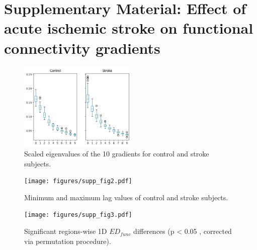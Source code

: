 \documentclass[fleqn,10pt]{wlscirep}
\begin{document}

\printbibliography

\newpage
\appendix
\section*{Supplementary Material: Effect of acute ischemic stroke on functional connectivity gradients}

\setcounter{figure}{0}
\renewcommand{\figurename}{Supplementary Figure}

\begin{figure}[h!]
\centering
\includegraphics[width=0.5\textwidth]{figures/supp_fig1.png}
\renewcommand{\figurename}{Supplementary Figure}
\caption{\label{fig:lambdas} Scaled eigenvalues of the 10 gradients for control and stroke subjects.  } 
\end{figure}

\begin{figure}[b]
\centering
\texttt{[image: figures/supp\_fig2.pdf]}
\caption{\label{fig:lags_hist}  Minimum and maximum lag values of control and stroke subjects.}
\end{figure}

\begin{figure}[b]
\centering
\texttt{[image: figures/supp\_fig3.pdf]}
\caption{\label{fig:1d_edfunc}  Significant regions-wise 1D $\textit{ED}_{{func}}$ differences (p < 0.05 , corrected via permutation
procedure).}
\end{figure}
\end{document}
